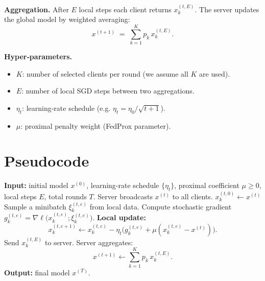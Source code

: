\documentclass{article}
\begin{document}
\medskip
\textbf{Aggregation.}  After $E$ local steps each client returns $x_{k}^{(t,E)}$.
The server updates the global model by weighted averaging:
\begin{equation}
\label{eq:global_agg}
x^{(t+1)}\;=\;\sum_{k=1}^{K} p_k\,x_{k}^{(t,E)} .
\end{equation}

\medskip
\textbf{Hyper‑parameters.}
\begin{itemize}
    \item $K$: number of selected clients per round (we assume all $K$ are used).
    \item $E$: number of local SGD steps between two aggregations.
    \item $\eta_{t}$: learning‑rate schedule (e.g. $\eta_{t}= \eta_0/\sqrt{t+1}$).
    \item $\mu$: proximal penalty weight (FedProx parameter).
\end{itemize}

\section*{Pseudocode}
\begin{algorithm}[H]
\caption{FedProx (Local SGD with Proximal Term)}
\begin{algorithmic}[1]
\State \textbf{Input:} initial model $x^{(0)}$, learning‑rate schedule $\{\eta_t\}$,
proximal coefficient $\mu\ge0$, local steps $E$, total rounds $T$.
    \State Server broadcasts $x^{(t)}$ to all clients.
        \State $x_{k}^{(t,0)} \gets x^{(t)}$
            \State Sample a minibatch $\xi_{k}^{(t,e)}$ from local data.
            \State Compute stochastic gradient $g_{k}^{(t,e)}=
                    \nabla \ell\!\bigl(x_{k}^{(t,e)};\xi_{k}^{(t,e)}\bigr)$.
            \State \textbf{Local update:}
            \[
            x_{k}^{(t,e+1)} \gets
            x_{k}^{(t,e)} - \eta_{t}\bigl(g_{k}^{(t,e)}+\mu(x_{k}^{(t,e)}-x^{(t)})\bigr).
            \]
        \EndFor
        \State Send $x_{k}^{(t,E)}$ to server.
    \EndFor
    \State Server aggregates:
    \[
    x^{(t+1)} \gets \sum_{k=1}^{K} p_k\,x_{k}^{(t,E)} .
    \]
\EndFor
\State \textbf{Output:} final model $x^{(T)}$.
\end{algorithmic}
\end{algorithm}
\end{document}
